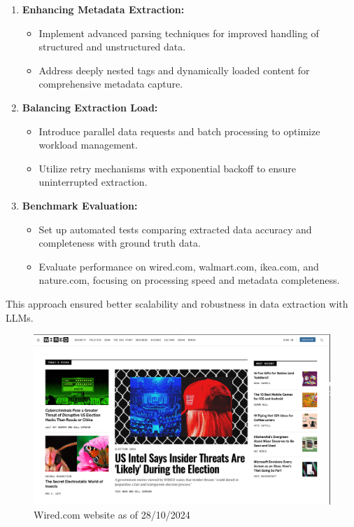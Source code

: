 \begin{enumerate}
    \item \textbf{Enhancing Metadata Extraction:}
    \begin{itemize}
        \item Implement advanced parsing techniques for improved handling of structured and unstructured data.
        \item Address deeply nested tags and dynamically loaded content for comprehensive metadata capture.
    \end{itemize}
    
    \item \textbf{Balancing Extraction Load:}
    \begin{itemize}
        \item Introduce parallel data requests and batch processing to optimize workload management.
        \item Utilize retry mechanisms with exponential backoff to ensure uninterrupted extraction.
    \end{itemize}
    
    \item \textbf{Benchmark Evaluation:}
    \begin{itemize}
        \item Set up automated tests comparing extracted data accuracy and completeness with ground truth data.
        \item Evaluate performance on wired.com, walmart.com, ikea.com, and nature.com, focusing on processing speed and metadata completeness.
    \end{itemize}
\end{enumerate}

This approach ensured better scalability and robustness in data extraction with LLMs.

\begin{figure}[H]
    \centering
    \includegraphics[width=0.95\linewidth]{Assets/wired.png}
    \caption{Wired.com website as of 28/10/2024}
    \label{fig:enter-label}
\end{figure}

